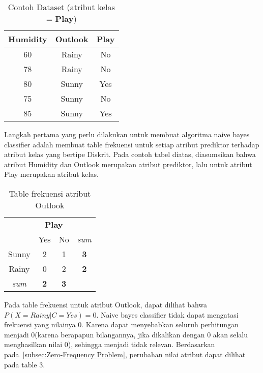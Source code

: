 		\begin{table}[H]
		\label{tab:dataset}
		\centering
		\caption{Contoh Dataset (atribut kelas = \textbf{Play})}
		\begin{tabular}{ | c | c | c | }
		\hline
		 Humidity & Outlook & \textbf{Play}\\ \hline \hline
		60 & Rainy & No\\ \hline
		78 & Rainy & No\\ \hline
		80 & Sunny & Yes\\ \hline
		75 & Sunny & No\\ \hline
		85 & Sunny & Yes \\ \hline
		\end{tabular}
		\end{table}
		
		
		Langkah pertama yang perlu dilakukan untuk membuat algoritma naive bayes classifier adalah membuat table frekuensi untuk setiap atribut prediktor terhadap atribut kelas yang bertipe Diskrit. Pada contoh tabel diatas, diasumsikan bahwa atribut Humidity dan Outlook merupakan atribut prediktor, lalu untuk atribut Play merupakan atribut kelas.
		
		\begin{table}[ht]
			\centering
			\caption{Table frekuensi atribut Outlook}
			\begin{tabular}{ | c | c | c | c | }
			\hline
			 & \multicolumn{2}{c}{\textbf{Play}} & \\ 
			 & Yes & No & \textit{sum} \\
			\hline
			Sunny & 2 & 1 & \textbf{3}\\
			\hline
			Rainy & 0 & 2 & \textbf{2} \\
			\hline
			\textit{sum} & \textbf{2} & \textbf{3} & \\
			\hline
			\end{tabular}
		\end{table}
		
		Pada table frekuensi untuk atribut Outlook, dapat dilihat bahwa $P(X=Rainy|C=Yes) = 0$. Naive bayes classifier tidak dapat mengatasi frekuensi yang nilainya 0. Karena dapat menyebabkan seluruh perhitungan menjadi 0(karena berapapun bilangannya, jika dikalikan dengan 0 akan selalu menghasilkan nilai 0), sehingga menjadi tidak relevan. Berdasarkan pada~\ref{subsec:Zero-Frequency Problem}, perubahan nilai atribut dapat dilihat pada table 3. \\ 

